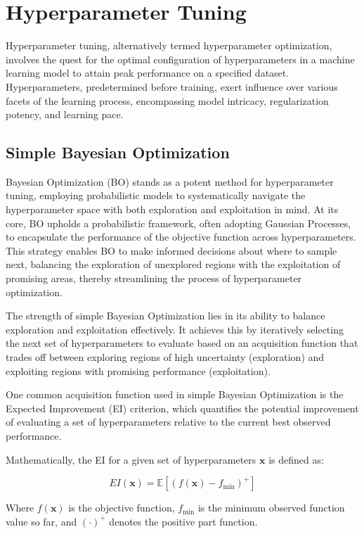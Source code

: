 \section{Hyperparameter Tuning}

Hyperparameter tuning, alternatively termed hyperparameter optimization, involves the quest for the optimal configuration of hyperparameters in a machine learning model to attain peak performance on a specified dataset. Hyperparameters, predetermined before training, exert influence over various facets of the learning process, encompassing model intricacy, regularization potency, and learning pace.

\subsection{Simple Bayesian Optimization}


Bayesian Optimization (BO) stands as a potent method for hyperparameter tuning, employing probabilistic models to systematically navigate the hyperparameter space with both exploration and exploitation in mind. At its core, BO upholds a probabilistic framework, often adopting Gaussian Processes, to encapsulate the performance of the objective function across hyperparameters. This strategy enables BO to make informed decisions about where to sample next, balancing the exploration of unexplored regions with the exploitation of promising areas, thereby streamlining the process of hyperparameter optimization.

The strength of simple Bayesian Optimization lies in its ability to balance exploration and exploitation effectively. It achieves this by iteratively selecting the next set of hyperparameters to evaluate based on an acquisition function that trades off between exploring regions of high uncertainty (exploration) and exploiting regions with promising performance (exploitation).

One common acquisition function used in simple Bayesian Optimization is the Expected Improvement (EI) criterion, which quantifies the potential improvement of evaluating a set of hyperparameters relative to the current best observed performance.

Mathematically, the EI for a given set of hyperparameters $\boldsymbol{x}$ is defined as:

\[
EI(\boldsymbol{x}) = \mathbb{E}[(f(\boldsymbol{x}) - f_{\text{min}})^+]
\]

Where $f(\boldsymbol{x})$ is the objective function, $f_{\text{min}}$ is the minimum observed function value so far, and $(\cdot)^+$ denotes the positive part function.

